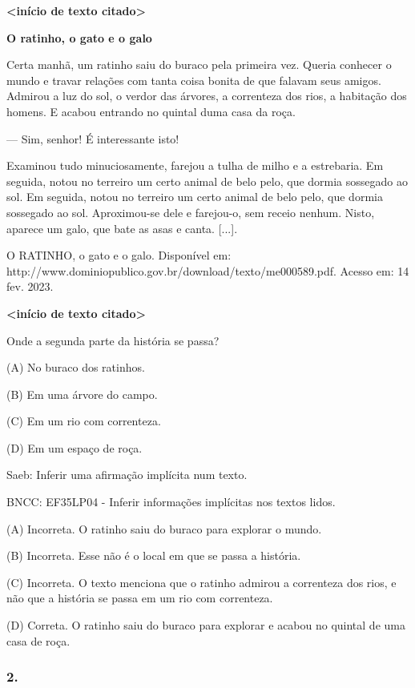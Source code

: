 \textbf{\textless{}início de texto citado\textgreater{}}

\textbf{O ratinho, o gato e o galo}

Certa manhã, um ratinho saiu do buraco pela primeira vez. Queria
conhecer o mundo e travar relações com tanta coisa bonita de que falavam
seus amigos. Admirou a luz do sol, o verdor das árvores, a correnteza
dos rios, a habitação dos homens. E acabou entrando no quintal duma casa
da roça.

--- Sim, senhor! É interessante isto!

Examinou tudo minuciosamente, farejou a tulha de milho e a estrebaria.
Em seguida, notou no terreiro um certo animal de belo pelo, que dormia
sossegado ao sol. Em seguida, notou no terreiro um certo animal de belo
pelo, que dormia sossegado ao sol. Aproximou-se dele e farejou-o, sem
receio nenhum. Nisto, aparece um galo, que bate as asas e canta.
{[}...{]}.

O RATINHO, o gato e o galo. Disponível em:
http://www.dominiopublico.gov.br/download/texto/me000589.pdf. Acesso em:
14 fev. 2023.

\textbf{\textless{}início de texto citado\textgreater{}}

Onde a segunda parte da história se passa?

(A) No buraco dos ratinhos.

(B) Em uma árvore do campo.

(C) Em um rio com correnteza.

(D) Em um espaço de roça.

\protect\hypertarget{_Hlk127278651}{}{}Saeb: Inferir uma afirmação
implícita num texto.

BNCC: EF35LP04 - Inferir informações implícitas nos textos lidos.

(A) Incorreta. O ratinho saiu do buraco para explorar o mundo.

(B) Incorreta. Esse não é o local em que se passa a história.

(C) Incorreta. O texto menciona que o ratinho admirou a correnteza dos
rios, e não que a história se passa em um rio com correnteza.

(D) Correta. O ratinho saiu do buraco para explorar e acabou no quintal
de uma casa de roça.

\subsubsection{2. }\label{section-14}

